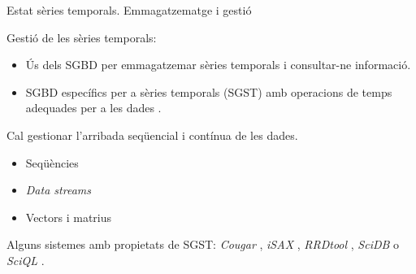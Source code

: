 \begin{frame}{Estat sèries temporals. Emmagatzematge i gestió}

  Gestió de les sèries temporals:

  \begin{itemize}

  \item Ús dels SGBD per emmagatzemar sèries temporals i consultar-ne
    informació.

  \item SGBD específics per a sèries temporals
    (SGST) amb operacions de temps adequades per
    a les dades \parencite{dreyer94}.

  \end{itemize}
  
    Cal gestionar l'arribada seqüencial i contínua de les dades.

    \begin{itemize}

    \item  Seqüències \parencite{seshadri95}

    \item \emph{Data streams} \parencite{babcock02}

    \item Vectors i matrius \parencite{stonebraker09:scidb,zhang11}

    \end{itemize}


  Alguns sistemes amb propietats de SGST: 
    \emph{Cougar} \parencite{cougar},
    \emph{iSAX} \parencite{keogh10:isax},
    \emph{RRDtool} \parencite{rrdtool},
    \emph{SciDB} \parencite{stonebraker09:scidb} o
    \emph{SciQL} \parencite{zhang11}.




\end{frame}




